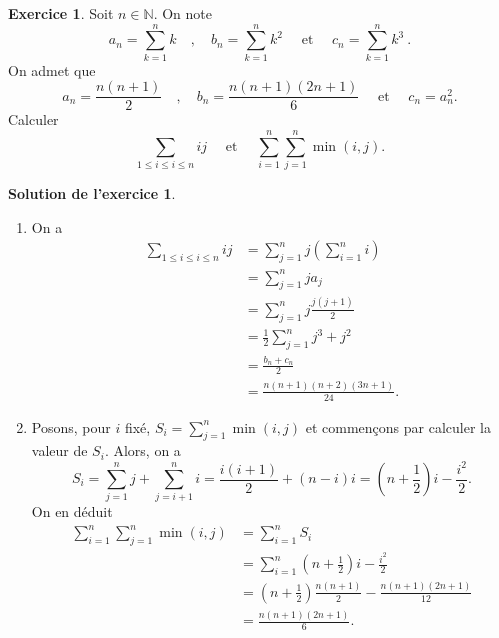 \documentclass[a4paper, 11pt,openany]{article}%
\theoremstyle{plain}
\theoremstyle{definition}
\newtheorem{exo}{Exercice}
\newtheorem{sol}{Solution de l'exercice}
\theoremstyle{remark}
\newcommand{\N}{\mathbb{N}}
\begin{document}
\begin{exo}
	Soit $n\in \N$. On note  
	\[
		a_n = \sum_{k=1}^n k
		\quad , \quad 
		b_n = \sum_{k=1}^n k^2
		\quad \mbox{ et }\quad 
		c_n = \sum_{k=1}^n k^3 \ .
	\]
	On admet que
		\[
		a_n = \frac{n(n+1)}{2}
		\quad , \quad 
		b_n = \frac{n(n+1)(2n+1)}{6}
		\quad \mbox{ et }\quad 
		c_n = a_n^2 .
	\]
Calculer $$\sum_{1\leqslant i \leqslant i \leqslant n} ij \quad \text{ et } \quad \sum_{i=1}^n \sum_{j=1}^n \min(i,j).$$
\end{exo}

   
\begin{sol}
\begin{enumerate}
	\item On a
	\[
		\begin{aligned}
			\sum_{1\leqslant i \leqslant i \leqslant n} ij 
			&= \sum_{j=1}^n j\left(\sum_{i = 1}^n i\right) \\
			&=  \sum_{j=1}^n ja_j \\
			&=  \sum_{j=1}^n j\frac{j(j+1)}{2} \\
			&= \frac 12 \sum_{j=1}^n j^3 +j^2 \\
			&= \frac{b_n+c_n}{2}\\
			&= \frac{n(n+1)(n+2)(3n+1)}{24}.
		\end{aligned}
	\]
	 \item Posons, pour $i$ fixé, $S_i = \sum_{j=1}^n \min(i,j)$ et commençons par calculer la valeur de $S_i$. Alors, on a
	 \[ S_i = \sum_{j=1}^n j + \sum_{j=i+1}^n i = \frac{i(i+1)}{2} + (n-i)i = \left( n + \frac{1}{2} \right)i - \frac{i^2}{2}.\]
	 On en déduit
	\[
		\begin{aligned}
			 \sum_{i=1}^n \sum_{j=1}^n \min(i,j)
			&= \sum_{i=1}^n S_i \\
			&=  \sum_{i=1}^n \left( n + \frac{1}{2} \right)i - \frac{i^2}{2} \\
			&=  \left( n + \frac{1}{2} \right)\frac{n(n+1)}{2} - \frac{n(n+1)(2n+1)}{12} \\
			&= \frac{n(n+1)(2n+1)}{6}.
		\end{aligned}
	\]
\end{enumerate}
\end{sol}
\end{document}
